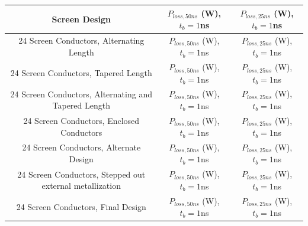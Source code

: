 \begin{table}
\label{tab:heating-mki-screen-designs}
\begin{center}
\begin{tabular}{c | c | c}
Screen Design & $P_{loss,50ns}$ (W), $t_{b}=1$ns & $P_{loss,25ns}$ (W), $t_{b}=1$ns \\ \hline 
24 Screen Conductors, Alternating Length & $P_{loss,50ns}$ (W), $t_{b}=1$ns & $P_{loss,25ns}$ (W), $t_{b}=1$ns \\ \hline 
24 Screen Conductors, Tapered Length & $P_{loss,50ns}$ (W), $t_{b}=1$ns & $P_{loss,25ns}$ (W), $t_{b}=1$ns \\ \hline 
24 Screen Conductors, Alternating and Tapered Length & $P_{loss,50ns}$ (W), $t_{b}=1$ns & $P_{loss,25ns}$ (W), $t_{b}=1$ns \\ \hline 
24 Screen Conductors, Enclosed Conductors & $P_{loss,50ns}$ (W), $t_{b}=1$ns & $P_{loss,25ns}$ (W), $t_{b}=1$ns \\ \hline 
24 Screen Conductors, Alternate Design & $P_{loss,50ns}$ (W), $t_{b}=1$ns & $P_{loss,25ns}$ (W), $t_{b}=1$ns \\ \hline 
24 Screen Conductors, Stepped out external metallization & $P_{loss,50ns}$ (W), $t_{b}=1$ns & $P_{loss,25ns}$ (W), $t_{b}=1$ns \\ \hline 
24 Screen Conductors, Final Design & $P_{loss,50ns}$ (W), $t_{b}=1$ns & $P_{loss,25ns}$ (W), $t_{b}=1$ns \\ \hline 
\end{tabular}
\end{center}
\end{table}
